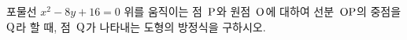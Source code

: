 포물선 $x^2-8y+16=0$ 위를 움직이는 점~$\mathrm{P}$와 원점~$\mathrm{O}$에 대하여 선분~$\mathrm{OP}$의 중점을 $\mathrm{Q}$라 할 때, 점~$\mathrm{Q}$가 나타내는 도형의 방정식을 구하시오.
